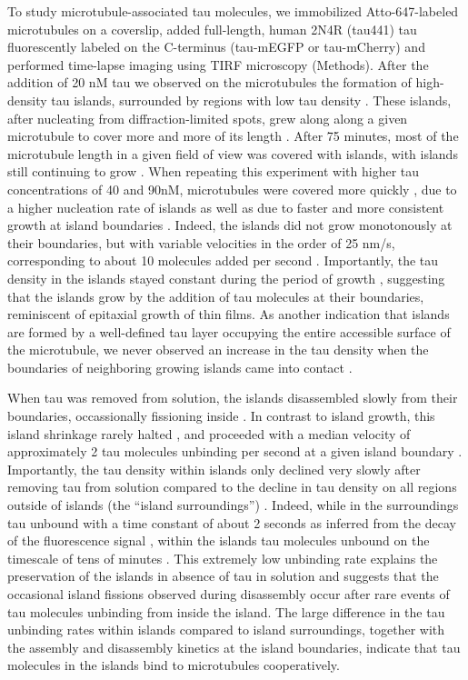 To study microtubule-associated tau molecules, we immobilized Atto-647-labeled microtubules on a coverslip, added full-length, human 2N4R (tau441) tau fluorescently labeled on the C-terminus (tau-mEGFP or tau-mCherry) and performed time-lapse imaging using TIRF microscopy (Methods). After the addition of 20 nM tau we observed on the microtubules the formation of high-density tau islands, surrounded by regions with low tau density . These islands, after nucleating from diffraction-limited spots, grew along along a given microtubule to cover more and more of its length . After 75 minutes, most of the microtubule length in a given field of view was covered with islands, with islands still continuing to grow . When repeating this experiment with higher tau concentrations of 40 and 90nM, microtubules were covered more quickly , due to a higher nucleation rate of islands  as well as due to faster and more consistent growth at island boundaries . Indeed, the islands did not grow monotonously at their boundaries, but with variable velocities in the order of 25 nm/s, corresponding to about 10 molecules added per second . Importantly, the tau density in the islands stayed constant during the period of growth , suggesting that the islands grow by the addition of tau molecules at their boundaries, reminiscent of epitaxial growth of thin films. As another indication that islands are formed by a well-defined tau layer occupying the entire accessible surface of the microtubule, we never observed an increase in the tau density when the boundaries of neighboring growing islands came into contact .\par

When tau was removed from solution, the islands disassembled slowly from their boundaries, occassionally fissioning inside . In contrast to island growth, this island shrinkage rarely halted , and proceeded with a median velocity of approximately 2 tau molecules unbinding per second at a given island boundary . Importantly, the tau density within islands only declined very slowly after removing tau from solution compared to the decline in tau density on all regions outside of islands (the “island surroundings”) . Indeed, while in the surroundings tau unbound with a time constant of about 2 seconds as inferred from the decay of the fluorescence signal , within the islands tau molecules unbound on the timescale of tens of minutes . This extremely low unbinding rate explains the preservation of the islands in absence of tau in solution and suggests that the occasional island fissions observed during disassembly occur after rare events of tau molecules unbinding from inside the island. The large difference in the tau unbinding rates within islands compared to island surroundings, together with the assembly and disassembly kinetics at the island boundaries, indicate that tau molecules in the islands bind to microtubules cooperatively. 

